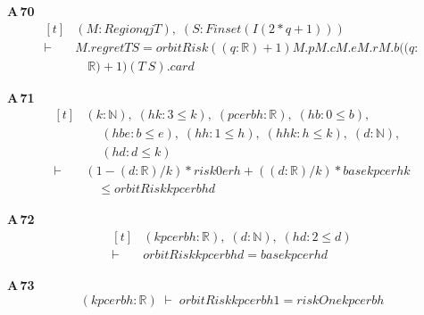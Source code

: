 \noindent\textbf{A\,70}\quad{}
{\footnotesize\[ \begin{aligned}[t]
&(\mathit{M} : \mathit{Region} \mathit{q} \mathit{j} \mathit{T}),\; (\mathit{S} : \mathit{Finset} (\mathit{I} (2*\mathit{q}+1)))\\
\vdash\;&\mathit{M}.\mathit{regret} \mathit{T} \mathit{S}=\mathit{orbitRisk} ((\mathit{q}:\mathbb{R} )+1) \mathit{M}.\mathit{p} \mathit{M}.\mathit{c} \mathit{M}.\mathit{e} \mathit{M}.\mathit{r} \mathit{M}.\mathit{b} ((\mathit{q}:\\
&\quad \mathbb{R} )+1) (\mathit{T} \ \mathit{S}).\mathit{card}
\end{aligned} \]}

\noindent\textbf{A\,71}\quad{}
{\footnotesize\[ \begin{aligned}[t]
&(\mathit{k} : \mathbb{N} ),\; (\mathit{hk} : 3 \leq \mathit{k}),\; (\mathit{p} \mathit{c} \mathit{e} \mathit{r} \mathit{b} \mathit{h} : \mathbb{R} ),\; (\mathit{hb} : 0 \leq \mathit{b}),\\
&\quad \; (\mathit{hbe} : \mathit{b} \leq \mathit{e}),\; (\mathit{hh} : 1 \leq \mathit{h}),\; (\mathit{hhk} : \mathit{h} \leq \mathit{k}),\; (\mathit{d} : \mathbb{N} ),\\
&\quad \; (\mathit{hd} : \mathit{d} \leq \mathit{k})\\
\vdash\;&(1-(\mathit{d}:\mathbb{R} )/\mathit{k})*\mathit{risk0} \mathit{e} \mathit{r} \mathit{h}+((\mathit{d}:\mathbb{R} )/\mathit{k})*\mathit{base} \mathit{k} \mathit{p} \mathit{c} \mathit{e} \mathit{r} \mathit{h} \mathit{k}\\
&\quad \leq \mathit{orbitRisk} \mathit{k} \mathit{p} \mathit{c} \mathit{e} \mathit{r} \mathit{b} \mathit{h} \mathit{d}
\end{aligned} \]}

\noindent\textbf{A\,72}\quad{}
{\footnotesize\[ \begin{aligned}[t]
&(\mathit{k} \mathit{p} \mathit{c} \mathit{e} \mathit{r} \mathit{b} \mathit{h} : \mathbb{R} ),\; (\mathit{d} : \mathbb{N} ),\; (\mathit{hd} : 2 \leq \mathit{d})\\
\vdash\;&\mathit{orbitRisk} \mathit{k} \mathit{p} \mathit{c} \mathit{e} \mathit{r} \mathit{b} \mathit{h} \mathit{d}=\mathit{base} \mathit{k} \mathit{p} \mathit{c} \mathit{e} \mathit{r} \mathit{h} \mathit{d}
\end{aligned} \]}

\noindent\textbf{A\,73}\quad{}
{\footnotesize\[ (\mathit{k} \mathit{p} \mathit{c} \mathit{e} \mathit{r} \mathit{b} \mathit{h} : \mathbb{R} ) \;\vdash\; \mathit{orbitRisk} \mathit{k} \mathit{p} \mathit{c} \mathit{e} \mathit{r} \mathit{b} \mathit{h} 1=\mathit{riskOne} \mathit{k} \mathit{p} \mathit{c} \mathit{e} \mathit{r} \mathit{b} \mathit{h} \]}


